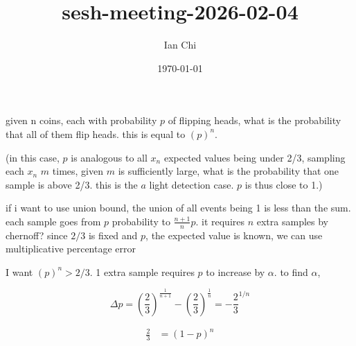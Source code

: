 \documentclass{article}
\title{sesh-meeting-2026-02-04}
\author{Ian Chi}
\date{\today}
\begin{document}
\maketitle

given n coins, each with probability \(p\) of flipping heads, what is the probability that all of them flip heads. this is equal to \((p)^n\). 

(in this case, \(p\) is analogous to all \(x_{n}\) expected values being under 2/3, sampling each \(x_n\) \(m\) times, given \(m\) is sufficiently large, what is the probability that one sample is above 2/3. this is the \(a\) light detection case. \(p\) is thus close to 1.)


if i want to use union bound, the union of all events being 1 is less than the sum. each sample goes from \(p\) probability to \(\frac{n+1}{n}p\). it requires \(n\) extra samples by chernoff? since \(2/3\) is fixed and \(p\), the expected value is known, we can use multiplicative percentage error





I want \(\left( p \right)^n >2/3\). 1 extra sample requires \(p\) to increase by \(\alpha\). to find \(\alpha\), 

$$\Delta p = \left( \frac{2}{3} \right)^{\frac{1}{n+1}} - \left( \frac{2}{3} \right)^{\frac{1}{n}} = -\frac{2}{3}^{1/n}$$

\begin{equation}
    \begin{split}
        \frac{2}{3} &= \left( 1-p \right)^n \\
    \end{split}
\end{equation}
\end{document}
